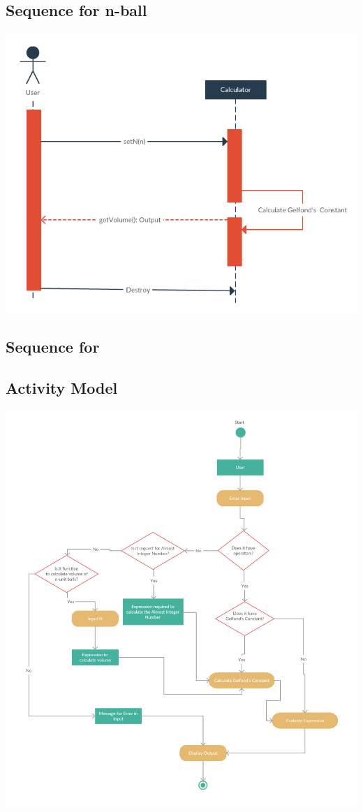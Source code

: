 \documentclass{article}
\begin{document}
\subsection{Sequence for n-ball}
\begin{center}
    \includegraphics[scale=0.4]{images/n4-sequence-2.png}
\end{center}

\subsection{Sequence for }

\subsection{Activity Model}
\begin{center}
    \includegraphics[scale=0.37]{images/n4-activity-model.png}
\end{center}

\printbibliography
\end{document}
